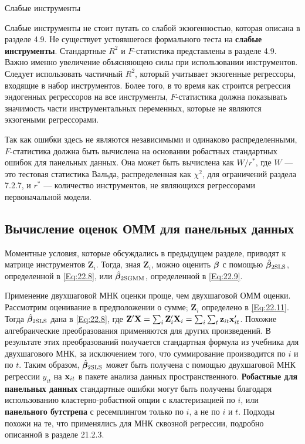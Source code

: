 {\centering  Слабые инструменты}
 

Слабые инструменты не стоит путать со слабой экзогенностью, которая описана в разделе 4.9. Не существует устоявшегося формального теста на \textbf{слабые инструменты}. Стандартные $R^2$ и $F$-статистика представлены в разделе 4.9. Важно именно увеличение объясняющею силы при использовании инструментов. Следует использовать частичный $R^2$, который учитывает экзогенные регрессоры, входящие в набор инструментов. Более того, в то время как строится регрессия эндогенных регрессоров на  все инструменты, $F$-статистика должна показывать значимость части инструментальных переменных, которые не являются экзогеными регрессорами.

Так как ошибки здесь  не являются независимыми и одинаково распределенными, $F$-статистика должна быть вычислена на основании робастных стандартных ошибок для  панельных данных. Она может быть вычислена как $W/r^*$, где $W$  --- это тестовая статистика Вальда, распределенная как $\chi^2$, для ограничений раздела 7.2.7, и $r^*$ --- количество инструментов, не являющихся регрессорами первоначальной модели.

\subsection{Вычисление оценок ОММ для панельных данных}

Моментные условия, которые обсуждались в предыдущем разделе, приводят к матрице инструментов $\mathbf Z_i$. Тогда, зная $\mathbf Z_i$, можно оценить $\bm{\beta}$ с помощью $\hat{\bm{\beta}}_{\mathrm{2SLS}}$, определенной в \ref{Eq:22.8}, или $\hat{\bm{\beta}}_{\mathrm{2SGMM}}$, определенной в \ref{Eq:22.9}.

Применение двухшаговой МНК оценки проще, чем двухшаговой ОММ оценки. Рассмотрим оценивание в предположении о сумме; $\mathbf Z_i$ определено в \ref{Eq:22.11}. Тогда $\hat{\bm{\beta}}_{\mathrm{2SLS}}$ дана в \ref{Eq:22.8}, где $\mathbf Z' \mathbf X =\sum_i \mathbf Z_i' \mathbf X_i=\sum_i \sum_t \mathbf z_{it} \mathbf{x}'_{it}$. Похожие алгебраические преобразования применяются для других произведений. В результате этих преобразований получается стандартная формула из учебника для двухшагового МНК, за исключением того, что суммирование производится по $i$ и по $t$. Таким образом, $\hat{\bm{\beta}}_{\mathrm{2SLS}}$ может быть получена с помощью двухшаговой МНК регрессии $y_{it}$ на $\mathbf{x}_{it}$ в пакете анализа данных пространственного. \textbf{Робастные для панельных данных} стандартные ошибки могут быть получены благодаря использованию кластерно-робастной опции с кластеризацией по $i$, или \textbf{панельного бутстрепа} с ресемплингом только по $i$, а не по  $i$ и $t$. Подходы похожи на те, что применялись для МНК сквозной регрессии, подробно описанной в разделе 21.2.3. 

